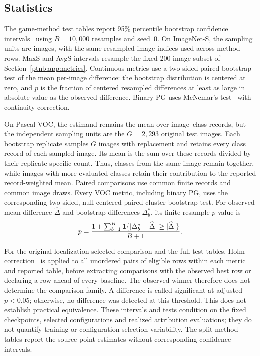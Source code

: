 \subsection{Statistics}\label{ptnb:app:stats}

The game-method test tables report 95\% percentile bootstrap confidence
intervals~\parencite{Efron1993bootstrap} using $B=10{,}000$ resamples and seed~$0$. On ImageNet-S,
the sampling units are images, with the same resampled image indices used across method rows.
MaxS and AvgS intervals resample the fixed 200-image subset of Section~\ref{ptnb:app:metrics}.
Continuous metrics use a two-sided paired bootstrap test of the mean per-image difference: the
bootstrap distribution is centered at zero, and $p$ is the fraction of centered resampled
differences at least as large in absolute value as the observed difference. Binary PG uses
McNemar's test~\parencite{McNemar1947} with continuity correction.

On Pascal VOC, the estimand remains the mean over image--class records, but the independent
sampling units are the $G=2{,}293$ original test images. Each bootstrap replicate samples $G$
images with replacement and retains every class record of each sampled image. Its mean is the sum
over these records divided by their replicate-specific count. Thus, classes from the same image
remain together, while images with more evaluated classes retain their contribution to the
reported record-weighted mean. Paired comparisons use common finite records and common image
draws. Every VOC metric, including binary PG, uses the corresponding two-sided, null-centered
paired cluster-bootstrap test. For observed mean difference $\widehat\Delta$ and bootstrap
differences $\Delta_b^*$, its finite-resample $p$-value is
\begin{align}
    p=\frac{1+\sum_{b=1}^{B}\mathbf{1}\{\lvert\Delta_b^*-\widehat\Delta\rvert
        \geq\lvert\widehat\Delta\rvert\}}{B+1}.
\end{align}

For the original localization-selected comparison and the full test tables, Holm correction~\parencite{Holm1979} is applied to all unordered
pairs of eligible rows within each metric and reported table, before extracting comparisons with
the observed best row or declaring a row ahead of every baseline. The observed winner therefore
does not determine the comparison family. A difference is called significant at adjusted
$p<0.05$; otherwise, no difference was detected at this threshold. This does not establish
practical equivalence. These intervals and tests condition on the fixed checkpoints, selected
configurations and realized attribution evaluations; they do not quantify training or
configuration-selection variability. The split-method tables report the source point estimates
without corresponding confidence intervals.

